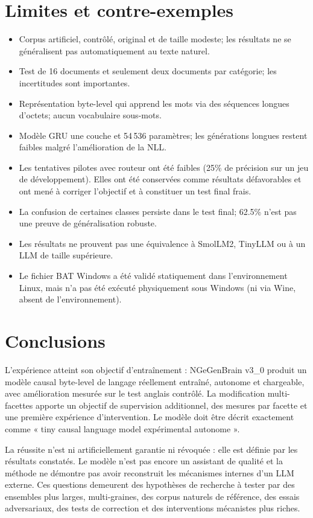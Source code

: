 \documentclass[11pt,a4paper]{article}
\begin{document}
\section{Limites et contre-exemples}
\begin{itemize}[leftmargin=*]
\item Corpus artificiel, contrôlé, original et de taille modeste; les résultats ne se généralisent pas automatiquement au texte naturel.
\item Test de 16 documents et seulement deux documents par catégorie; les incertitudes sont importantes.
\item Représentation byte-level qui apprend les mots via des séquences longues d'octets; aucun vocabulaire sous-mots.
\item Modèle GRU une couche et 54\,536 paramètres; les générations longues restent faibles malgré l'amélioration de la NLL.
\item Les tentatives pilotes avec routeur ont été faibles (25\% de précision sur un jeu de développement). Elles ont été conservées comme résultats défavorables et ont mené à corriger l'objectif et à constituer un test final frais.
\item La confusion de certaines classes persiste dans le test final; 62.5\% n'est pas une preuve de généralisation robuste.
\item Les résultats ne prouvent pas une équivalence à SmolLM2, TinyLLM ou à un LLM de taille supérieure.
\item Le fichier BAT Windows a été validé statiquement dans l'environnement Linux, mais n'a pas été exécuté physiquement sous Windows (ni via Wine, absent de l'environnement).
\end{itemize}

\section{Conclusions}
L'expérience atteint son objectif d'entraînement : NGeGenBrain v3\_0 produit un modèle causal byte-level de langage réellement entraîné, autonome et chargeable, avec amélioration mesurée sur le test anglais contrôlé. La modification multi-facettes apporte un objectif de supervision additionnel, des mesures par facette et une première expérience d'intervention. Le modèle doit être décrit exactement comme « tiny causal language model expérimental autonome ».

La réussite n'est ni artificiellement garantie ni révoquée : elle est définie par les résultats constatés. Le modèle n'est pas encore un assistant de qualité et la méthode ne démontre pas avoir reconstruit les mécanismes internes d'un LLM externe. Ces questions demeurent des hypothèses de recherche à tester par des ensembles plus larges, multi-graines, des corpus naturels de référence, des essais adversariaux, des tests de correction et des interventions mécanistes plus riches.
\end{document}

